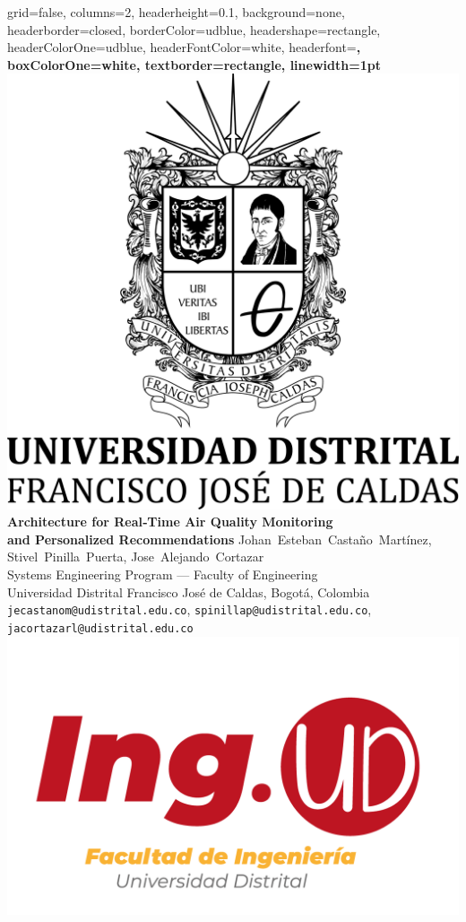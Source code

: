 \documentclass[a0paper,portrait]{baposter}
\begin{document}
\begin{poster}{
  grid=false,
  columns=2,
  headerheight=0.1\textheight,
  background=none,
  headerborder=closed,
  borderColor=udblue,
  headershape=rectangle,
  headerColorOne=udblue,
  headerFontColor=white,
  headerfont=\Large\bfseries,
  boxColorOne=white,
  textborder=rectangle,
  linewidth=1pt
}
{
  \includegraphics[height=0.9\headerheight]{images/logo_escudo_vertical.png}
}
{\Large\bf Architecture for Real‑Time Air Quality Monitoring\\and Personalized Recommendations}
{\small
  Johan~Esteban~Castaño~Martínez, Stivel~Pinilla~Puerta, Jose~Alejando~Cortazar\\
  Systems Engineering Program — Faculty of Engineering\\
  Universidad Distrital Francisco José de Caldas, Bogotá, Colombia\\
  \texttt{jecastanom@udistrital.edu.co}, \texttt{spinillap@udistrital.edu.co}, \texttt{jacortazarl@udistrital.edu.co}
}
{
  \includegraphics[height=0.75\headerheight]{images/identidad facultad-02.png}
}


\end{poster}
\end{document}
